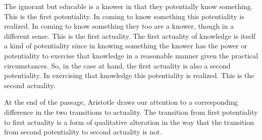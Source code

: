 The ignorant but educable is a knower in that they potentially know something. This is the first potentiality. In coming to know something this potentiality is realized. In coming to know something they too are a knower, though in a different sense. This is the first actuality. The first actuality of knowledge is itself a kind of potentiality since in knowing something the knower has the power or potentiality to exercise that knowledge in a reasonable manner given the practical circumstances. So, in the case at hand, the first actuality is also a second potentiality. In exercising that knowledge this potentiality is realized. This is the second actuality.

At the end of the passage, Aristotle draws our attention to a corresponding difference in the two transitions to actuality. The transition from first potentiality to first actuality is a form of qualitative alteration in the way that the transition from second potentiality to second actuality is not.


